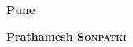 \documentclass[11pt,a4paper]{moderncv}
\begin{document}
\begin{minipage}{0.5\textwidth}
\begin{flushleft}
  \large
\bfseries Pune
\end{flushleft}
\end{minipage}
\begin{minipage}{0.5\textwidth}

\begin{flushright}
  \large
\bfseries Prathamesh \textsc{Sonpatki}
\end{flushright}
\end{minipage}

\end{document}
